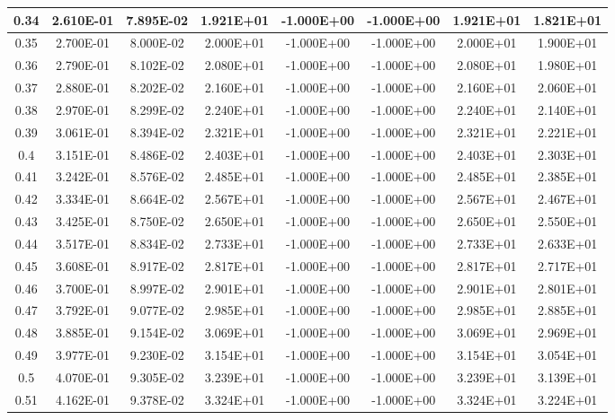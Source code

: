 \documentclass{article}
\begin{document}
\begin{center}
\begin{longtable}{|c|c|c|c|c|c|c|c|}
    0.34 & 2.610E-01 & 7.895E-02 & 1.921E+01 & -1.000E+00 & -1.000E+00 & 1.921E+01 & 1.821E+01 \\ \hline
    0.35 & 2.700E-01 & 8.000E-02 & 2.000E+01 & -1.000E+00 & -1.000E+00 & 2.000E+01 & 1.900E+01 \\ \hline
    0.36 & 2.790E-01 & 8.102E-02 & 2.080E+01 & -1.000E+00 & -1.000E+00 & 2.080E+01 & 1.980E+01 \\ \hline
    0.37 & 2.880E-01 & 8.202E-02 & 2.160E+01 & -1.000E+00 & -1.000E+00 & 2.160E+01 & 2.060E+01 \\ \hline
    0.38 & 2.970E-01 & 8.299E-02 & 2.240E+01 & -1.000E+00 & -1.000E+00 & 2.240E+01 & 2.140E+01 \\ \hline
    0.39 & 3.061E-01 & 8.394E-02 & 2.321E+01 & -1.000E+00 & -1.000E+00 & 2.321E+01 & 2.221E+01 \\ \hline
    0.4 & 3.151E-01 & 8.486E-02 & 2.403E+01 & -1.000E+00 & -1.000E+00 & 2.403E+01 & 2.303E+01 \\ \hline
    0.41 & 3.242E-01 & 8.576E-02 & 2.485E+01 & -1.000E+00 & -1.000E+00 & 2.485E+01 & 2.385E+01 \\ \hline
    0.42 & 3.334E-01 & 8.664E-02 & 2.567E+01 & -1.000E+00 & -1.000E+00 & 2.567E+01 & 2.467E+01 \\ \hline
    0.43 & 3.425E-01 & 8.750E-02 & 2.650E+01 & -1.000E+00 & -1.000E+00 & 2.650E+01 & 2.550E+01 \\ \hline
    0.44 & 3.517E-01 & 8.834E-02 & 2.733E+01 & -1.000E+00 & -1.000E+00 & 2.733E+01 & 2.633E+01 \\ \hline
    0.45 & 3.608E-01 & 8.917E-02 & 2.817E+01 & -1.000E+00 & -1.000E+00 & 2.817E+01 & 2.717E+01 \\ \hline
    0.46 & 3.700E-01 & 8.997E-02 & 2.901E+01 & -1.000E+00 & -1.000E+00 & 2.901E+01 & 2.801E+01 \\ \hline
    0.47 & 3.792E-01 & 9.077E-02 & 2.985E+01 & -1.000E+00 & -1.000E+00 & 2.985E+01 & 2.885E+01 \\ \hline
    0.48 & 3.885E-01 & 9.154E-02 & 3.069E+01 & -1.000E+00 & -1.000E+00 & 3.069E+01 & 2.969E+01 \\ \hline
    0.49 & 3.977E-01 & 9.230E-02 & 3.154E+01 & -1.000E+00 & -1.000E+00 & 3.154E+01 & 3.054E+01 \\ \hline
    0.5 & 4.070E-01 & 9.305E-02 & 3.239E+01 & -1.000E+00 & -1.000E+00 & 3.239E+01 & 3.139E+01 \\ \hline
    0.51 & 4.162E-01 & 9.378E-02 & 3.324E+01 & -1.000E+00 & -1.000E+00 & 3.324E+01 & 3.224E+01 \\ \hline

\end{longtable}
\end{center}
\end{document}
